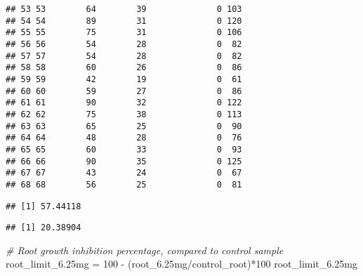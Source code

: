 \documentclass[
]{article}
\newenvironment{Shaded}{\begin{snugshade}}{\end{snugshade}}
\newcommand{\CommentTok}[1]{\textcolor[rgb]{0.56,0.35,0.01}{\textit{#1}}}
\newcommand{\DecValTok}[1]{\textcolor[rgb]{0.00,0.00,0.81}{#1}}
\newcommand{\FloatTok}[1]{\textcolor[rgb]{0.00,0.00,0.81}{#1}}
\newcommand{\FunctionTok}[1]{\textcolor[rgb]{0.00,0.00,0.00}{#1}}
\newcommand{\NormalTok}[1]{#1}
\newcommand{\OtherTok}[1]{\textcolor[rgb]{0.56,0.35,0.01}{#1}}
\newcommand{\SpecialCharTok}[1]{\textcolor[rgb]{0.00,0.00,0.00}{#1}}
\begin{document}
\begin{verbatim}
## 53 53        64        39              0 103
## 54 54        89        31              0 120
## 55 55        75        31              0 106
## 56 56        54        28              0  82
## 57 57        54        28              0  82
## 58 58        60        26              0  86
## 59 59        42        19              0  61
## 60 60        59        27              0  86
## 61 61        90        32              0 122
## 62 62        75        38              0 113
## 63 63        65        25              0  90
## 64 64        48        28              0  76
## 65 65        60        33              0  93
## 66 66        90        35              0 125
## 67 67        43        24              0  67
## 68 68        56        25              0  81
\end{verbatim}

\begin{Shaded}
\end{Shaded}

\begin{verbatim}
## [1] 57.44118
\end{verbatim}

\begin{Shaded}
\end{Shaded}

\begin{verbatim}
## [1] 20.38904
\end{verbatim}

\begin{Shaded}
\begin{Highlighting}[]
\CommentTok{\# Root growth inhibition percentage, compared to control sample}
\NormalTok{root\_limit\_6}\FloatTok{.25}\NormalTok{mg }\OtherTok{=} \DecValTok{100} \SpecialCharTok{{-}}\NormalTok{ (root\_6}\FloatTok{.25}\NormalTok{mg}\SpecialCharTok{/}\NormalTok{control\_root)}\SpecialCharTok{*}\DecValTok{100}
\NormalTok{root\_limit\_6}\FloatTok{.25}\NormalTok{mg}
\end{Highlighting}
\end{Shaded}
\end{document}
